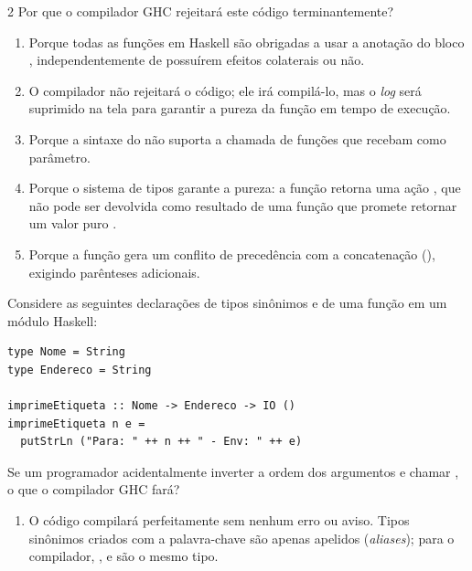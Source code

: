 \documentclass[a4paper,10pt,brazil]{article}
\begin{document}
\begin{multicols}{2}
Por que o compilador GHC rejeitará este código terminantemente?

\begin{enumerate}
  \item Porque todas as funções em Haskell são obrigadas a usar a anotação do bloco , independentemente de possuírem efeitos colaterais ou não.

  \item O compilador não rejeitará o código; ele irá compilá-lo, mas o \emph{log} será suprimido na tela para garantir a pureza da função em tempo de execução.

  \item Porque a sintaxe do  não suporta a chamada de funções que recebam  como parâmetro.

  \item Porque o sistema de tipos garante a pureza: a função  retorna uma ação , que não pode ser devolvida como resultado de uma função que promete retornar um valor puro .

  \item Porque a função  gera um conflito de precedência com a concatenação (\haskellinline{++}), exigindo parênteses adicionais.


\end{enumerate}

Considere as seguintes declarações de tipos sinônimos e de uma função em um módulo Haskell:

\begin{verbatim}
type Nome = String
type Endereco = String

imprimeEtiqueta :: Nome -> Endereco -> IO ()
imprimeEtiqueta n e =
  putStrLn ("Para: " ++ n ++ " - Env: " ++ e)
\end{verbatim}

Se um programador acidentalmente inverter a ordem dos argumentos e chamar , o que o compilador GHC fará?

\begin{enumerate}
  \item O código compilará perfeitamente sem nenhum erro ou aviso. Tipos sinônimos criados com a palavra-chave  são apenas apelidos (\emph{aliases}); para o compilador, ,  e  são o mesmo tipo.


\end{enumerate}
\end{multicols}
\end{document}
